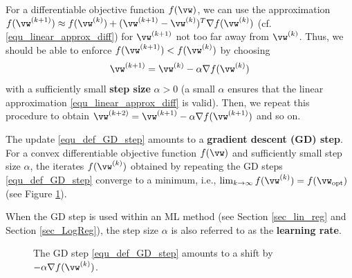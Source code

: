 \documentclass[12pt]{report}
\begin{document}
For a differentiable objective function $f(\vw)$, we can use the 
approximation $f(\vw^{(k+1)})  \approx f(\vw^{(k)}) + (\vw^{(k+1)} - \vw^{(k)})^{T} \nabla f(\vw^{(k)})$ (cf. \eqref{equ_linear_approx_diff}) for $\vw^{(k+1)}$ not too far away from $\vw^{(k)}$. %
Thus, we should be able to enforce $f(\vw^{(k+1)}) < f(\vw^{(k)})$ 
by choosing 
\begin{equation} 
\label{equ_def_GD_step}
\vw^{(k+1)} = \vw^{(k)} - \alpha \nabla f(\vw^{(k)})
\end{equation} 
with a sufficiently small {\bf step size} $\alpha>0$ (a small $\alpha$ 
ensures that the linear approximation \eqref{equ_linear_approx_diff} is valid). 
Then, we repeat this procedure to obtain $\vw^{(k+2)} = \vw^{(k+1)} - \alpha \nabla f(\vw^{(k+1)})$ and so on. 

The update \eqref{equ_def_GD_step} amounts to a {\bf gradient descent (GD) step}. 
For a convex differentiable objective function $f(\vw)$ 
and sufficiently small step size $\alpha$, the iterates $f(\vw^{(k)})$ 
obtained by repeating the GD steps \eqref{equ_def_GD_step} converge 
to a minimum, i.e., $\lim_{k \rightarrow \infty} f(\vw^{(k)}) = f(\vw_{\rm opt})$ (see Figure \ref{fig_basic_GD_step}). 

When the GD step is used within an ML method (see Section \ref{sec_lin_reg} 
and Section \ref{sec_LogReg}), the step size $\alpha$ is also referred to 
as the {\bf learning rate}. 
\begin{figure}
\begin{center}
\end{center}
\caption{The GD step \eqref{equ_def_GD_step} amounts to a shift by $-\alpha \nabla f(\vw^{(k)})$.}
\label{fig_basic_GD_step}
\end{figure}
\end{document}

